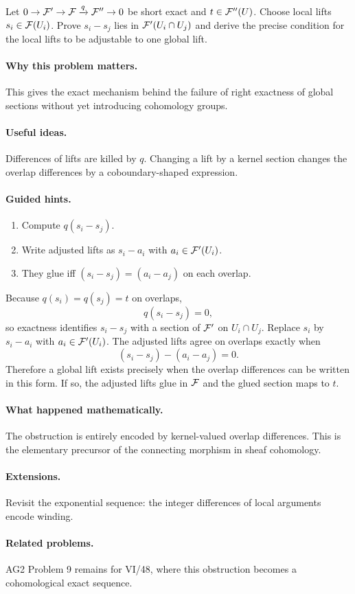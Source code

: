 \begin{problem}\label{prob:vi16-p20}
Let $0\to\mathcal F'\to\mathcal F\xrightarrow{q}\mathcal F''\to0$ be short exact and $t\in\mathcal F''(U)$.  Choose local lifts $s_i\in\mathcal F(U_i)$.  Prove $s_i-s_j$ lies in $\mathcal F'(U_i\cap U_j)$ and derive the precise condition for the local lifts to be adjustable to one global lift.
\end{problem}

\ifdefined\FullProblemDossiers
\paragraph{Why this problem matters.}
This gives the exact mechanism behind the failure of right exactness of global sections without yet introducing cohomology groups.

\paragraph{Useful ideas.}
Differences of lifts are killed by $q$.  Changing a lift by a kernel section changes the overlap differences by a coboundary-shaped expression.

\paragraph{Guided hints.}
\begin{enumerate}
\item Compute $q(s_i-s_j)$.
\item Write adjusted lifts as $s_i-a_i$ with $a_i\in\mathcal F'(U_i)$.
\item They glue iff $(s_i-s_j)=(a_i-a_j)$ on each overlap.
\end{enumerate}

\begin{solution}
Because $q(s_i)=q(s_j)=t$ on overlaps,
\[
q(s_i-s_j)=0,
\]
so exactness identifies $s_i-s_j$ with a section of $\mathcal F'$ on $U_i\cap U_j$.  Replace $s_i$ by $s_i-a_i$ with $a_i\in\mathcal F'(U_i)$.  The adjusted lifts agree on overlaps exactly when
\[
(s_i-s_j)-(a_i-a_j)=0.
\]
Therefore a global lift exists precisely when the overlap differences can be written in this form.  If so, the adjusted lifts glue in $\mathcal F$ and the glued section maps to $t$.
\end{solution}

\paragraph{What happened mathematically.}
The obstruction is entirely encoded by kernel-valued overlap differences.  This is the elementary precursor of the connecting morphism in sheaf cohomology.

\paragraph{Extensions.}
Revisit the exponential sequence: the integer differences of local arguments encode winding.

\paragraph{Related problems.}
AG2 Problem 9 remains for VI/48, where this obstruction becomes a cohomological exact sequence.
\fi
